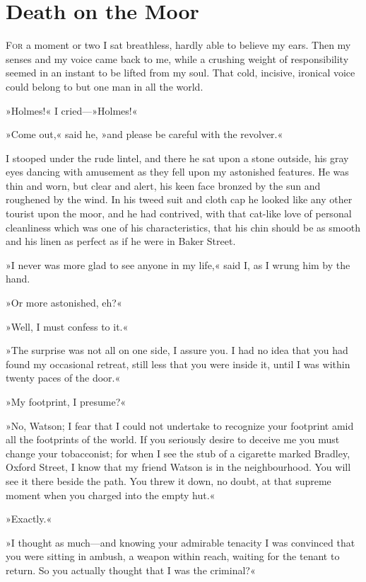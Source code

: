 \chapter{Death on the Moor}
\lettrine[lines=1]{F}{or} a moment or two I sat breathless, hardly able to believe my ears. Then my senses and my voice came back to me, while a crushing weight of responsibility seemed in an instant to be lifted from my soul. That cold, incisive, ironical voice could belong to but one man in all the world.

»Holmes!« I cried\allowbreak---\allowbreak  »Holmes!«

»Come out,« said he, »and please be careful with the revolver.«

I stooped under the rude lintel, and there he sat upon a stone outside, his gray eyes dancing with amusement as they fell upon my astonished features. He was thin and worn, but clear and alert, his keen face bronzed by the sun and roughened by the wind. In his tweed suit and cloth cap he looked like any other tourist upon the moor, and he had contrived, with that cat-like love of personal cleanliness which was one of his characteristics, that his chin should be as smooth and his linen as perfect as if he were in Baker Street.

»I never was more glad to see anyone in my life,« said I, as I wrung him by the hand.

»Or more astonished, eh?«

»Well, I must confess to it.«

»The surprise was not all on one side, I assure you. I had no idea that you had found my occasional retreat, still less that you were inside it, until I was within twenty paces of the door.«

»My footprint, I presume?«

»No, Watson; I fear that I could not undertake to recognize your footprint amid all the footprints of the world. If you seriously desire to deceive me you must change your tobacconist; for when I see the stub of a cigarette marked Bradley, Oxford Street, I know that my friend Watson is in the neighbourhood. You will see it there beside the path. You threw it down, no doubt, at that supreme moment when you charged into the empty hut.«

»Exactly.«

»I thought as much\allowbreak---\allowbreak and knowing your admirable tenacity I was convinced that you were sitting in ambush, a weapon within reach, waiting for the tenant to return. So you actually thought that I was the criminal?«

